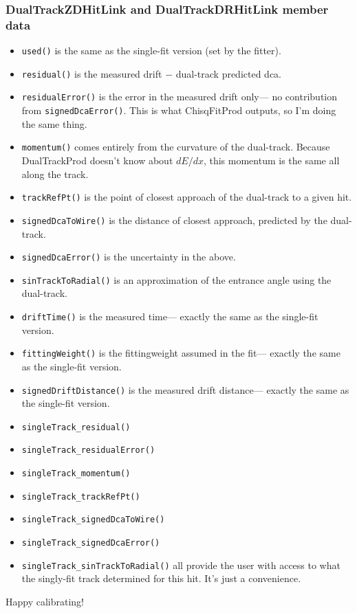 \documentclass[12pt]{article}
\begin{document}
\subsubsection{DualTrackZDHitLink and DualTrackDRHitLink member data}

\begin{itemize}

  \item {\tt used()} is the same as the single-fit version (set by the
  fitter).

  \item {\tt residual()} is the measured drift $-$ dual-track
  predicted dca.

  \item {\tt residualError()} is the error in the measured drift
  only--- no contribution from {\tt signedDcaError()}.  This is what
  ChisqFitProd outputs, so I'm doing the same thing.

  \item {\tt momentum()} comes entirely from the curvature of the
  dual-track.  Because DualTrackProd doesn't know about $dE/dx$, this
  momentum is the same all along the track.

  \item {\tt trackRefPt()} is the point of closest approach of the
  dual-track to a given hit.

  \item {\tt signedDcaToWire()} is the distance of closest approach,
  predicted by the dual-track.

  \item {\tt signedDcaError()} is the uncertainty in the above.

  \item {\tt sinTrackToRadial()} is an approximation of the entrance
  angle using the dual-track.

  \item {\tt driftTime()} is the measured time--- exactly the same as
  the single-fit version.

  \item {\tt fittingWeight()} is the fittingweight assumed in the
  fit--- exactly the same as the single-fit version.

  \item {\tt signedDriftDistance()} is the measured drift distance---
  exactly the same as the single-fit version.

  \item {\tt singleTrack\_residual()}
  \item {\tt singleTrack\_residualError()}
  \item {\tt singleTrack\_momentum()}
  \item {\tt singleTrack\_trackRefPt()}
  \item {\tt singleTrack\_signedDcaToWire()}
  \item {\tt singleTrack\_signedDcaError()}
  \item {\tt singleTrack\_sinTrackToRadial()} all provide the user
  with access to what the singly-fit track determined for this hit.
  It's just a convenience.

\end{itemize}

\vfill
\begin{center}
Happy calibrating!
\end{center}
\vfill
\end{document}
